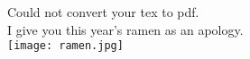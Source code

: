 \documentclass[dvipdfmx]{jsarticle}
\begin{document}

Could not convert your tex to pdf.\\
I give you this year's ramen as an apology.\\

\texttt{[image: ramen.jpg]}
\end{document}
